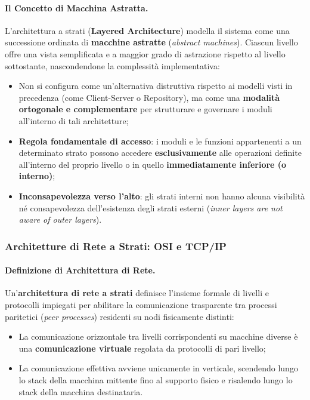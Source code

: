 \documentclass[12pt]{extarticle}
\begin{document}
\paragraph{Il Concetto di Macchina Astratta.}
L'architettura a strati (\textbf{Layered Architecture}) modella il sistema come una successione ordinata di \textbf{macchine astratte} (\textit{abstract machines}). Ciascun livello offre una vista semplificata e a maggior grado di astrazione rispetto al livello sottostante, nascondendone la complessità implementativa:
\begin{itemize}
    \item Non si configura come un'alternativa distruttiva rispetto ai modelli visti in precedenza (come Client-Server o Repository), ma come una \textbf{modalità ortogonale e complementare} per strutturare e governare i moduli all'interno di tali architetture;
    \item \textbf{Regola fondamentale di accesso}: i moduli e le funzioni appartenenti a un determinato strato possono accedere \textbf{esclusivamente} alle operazioni definite all'interno del proprio livello o in quello \textbf{immediatamente inferiore (o interno)};
    \item \textbf{Inconsapevolezza verso l'alto}: gli strati interni non hanno alcuna visibilità né consapevolezza dell'esistenza degli strati esterni (\textit{inner layers are not aware of outer layers}).
\end{itemize}

\subsubsection{Architetture di Rete a Strati: OSI e TCP/IP}

\paragraph{Definizione di Architettura di Rete.}
Un'\textbf{architettura di rete a strati} definisce l'insieme formale di livelli e protocolli impiegati per abilitare la comunicazione trasparente tra processi paritetici (\textit{peer processes}) residenti su nodi fisicamente distinti:
\begin{itemize}
    \item La comunicazione orizzontale tra livelli corrispondenti su macchine diverse è una \textbf{comunicazione virtuale} regolata da protocolli di pari livello;
    \item La comunicazione effettiva avviene unicamente in verticale, scendendo lungo lo stack della macchina mittente fino al supporto fisico e risalendo lungo lo stack della macchina destinataria.
\end{itemize}
\end{document}
